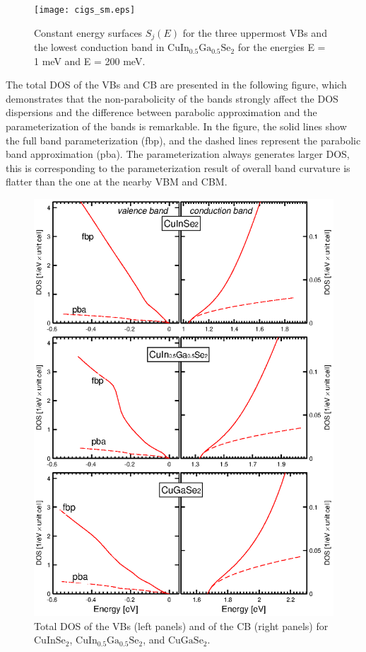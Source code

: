 \documentclass[a4paper, 12pt, titlepage,oneside,drop]{kthesis}
\begin{document}
\begin{figure}[H]
\begin{center}
\texttt{[image: cigs\_sm.eps]}
\end{center}
\caption{Constant energy surfaces $S_j(E)$ for the three uppermost VBs and the lowest conduction band in $\mathrm {CuIn_{0.5}Ga_{0.5}Se_2}$ for the energies E = 1 meV  and E = 200 meV. }
\end{figure}

The total DOS of the VBs and CB are presented in the following figure, which demonstrates that the non-parabolicity of the bands strongly affect the DOS dispersions
and the difference between parabolic approximation and the parameterization of the bands is remarkable. In the figure, the solid lines show the full band 
parameterization (fbp), and the dashed lines represent the parabolic band approximation (pba). The parameterization always generates larger DOS, this is
corresponding to the parameterization result of overall band curvature is flatter than the one at the nearby VBM and CBM.

\begin{figure}[H]
\begin{center}
\includegraphics[scale=.6]{paper2figure4.eps}
\end{center}
\caption{Total DOS of the VBs (left panels) and of the CB (right panels) for $\mathrm {CuInSe_2}$, $\mathrm {CuIn_{0.5}Ga_{0.5}Se_2}$, and $\mathrm {CuGaSe_2}$.  }
\end{figure}
\end{document}

